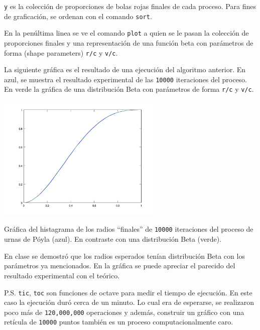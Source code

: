 \texttt{y} es la colección de proporciones de bolas rojas finales de cada proceso. Para 
fines de graficación, se ordenan con el
comando \texttt{sort}.\par\null

En la penúltima linea se ve el comando \texttt{plot} a quien se le pasan la colección 
de proporciones finales y una representación de una función beta con parámetros de forma 
(shape parameters) \texttt{r/c} y \texttt{v/c}.\par\null

La siguiente gráfica es el resultado de una ejecución del algoritmo anterior. En azul, se 
muestra el resultado experimental de las \texttt{10000} iteraciones del proceso. En verde 
la gráfica de una distribución Beta con parámetros de forma \texttt{r/c} y \texttt{v/c}.\par\null

\begin{center}
    \includegraphics[width=8cm]{tarea3/problema3_4/poylaBeta.PNG}\par\null
    Gr\'afica del histagrama de los radios ``finales'' de \texttt{10000} iteraciones del proceso 
	de urnas de P\'oyla (azul). En contraste con una distribución Beta (verde).\par\null
\end{center}

En clase se demostró que los radios esperados tenían distribución Beta con los parámetros 
ya mencionados. En la gráfica se puede apreciar el parecido del resultado experimental con el teórico.\par\null

P.S. \texttt{tic}, \texttt{toc} son funciones de octave para medir el tiempo de ejecución. En este caso
la ejecución duró cerca de un minuto. Lo cual era de esperarse, se realizaron poco más de \texttt{120,000,000} operaciones
y además, construir un gráfico con una retícula de \texttt{10000} puntos también es un proceso computacionalmente caro.